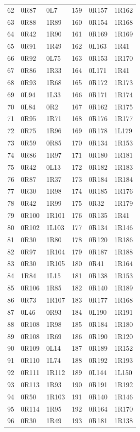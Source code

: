 \begin{longtable}{rll@{\qquad\qquad}rll}
62 & 0R87 & 0L7 & 159 & 0R157 & 1R162\\
63 & 0R88 & 1R89 & 160 & 0R154 & 1R168\\
64 & 0R42 & 1R90 & 161 & 0R169 & 1R169\\
65 & 0R91 & 1R49 & 162 & 0L163 & 1R41\\
66 & 0R92 & 0L75 & 163 & 0R153 & 1R170\\
67 & 0R86 & 1R33 & 164 & 0L171 & 1R41\\
68 & 0R93 & 1R68 & 165 & 0R172 & 1R173\\
69 & 0L94 & 1L33 & 166 & 0R171 & 1R174\\
70 & 0L84 & 0R2 & 167 & 0R162 & 1R175\\
71 & 0R95 & 1R71 & 168 & 0R176 & 1R177\\
72 & 0R75 & 1R96 & 169 & 0R178 & 1L179\\
73 & 0R59 & 0R85 & 170 & 0R134 & 1R153\\
74 & 0R86 & 1R97 & 171 & 0R180 & 1R181\\
75 & 0R42 & 0L13 & 172 & 0R182 & 1R183\\
76 & 0R87 & 1R37 & 173 & 0R184 & 1R184\\
77 & 0R30 & 1R98 & 174 & 0R185 & 1R176\\
78 & 0R42 & 1R99 & 175 & 0R32 & 1R179\\
79 & 0R100 & 1R101 & 176 & 0R135 & 1R41\\
80 & 0R102 & 1L103 & 177 & 0R134 & 1R146\\
81 & 0R30 & 1R80 & 178 & 0R120 & 1R186\\
82 & 0R97 & 1R104 & 179 & 0R187 & 1R188\\
83 & 0R30 & 1R105 & 180 & 0R41 & 1R164\\
84 & 1R84 & 1L15 & 181 & 0R138 & 1R153\\
85 & 0R106 & 1R85 & 182 & 0R140 & 1R189\\
86 & 0R73 & 1R107 & 183 & 0R177 & 1R168\\
87 & 0L46 & 0R93 & 184 & 0L190 & 1R191\\
88 & 0R108 & 1R98 & 185 & 0R184 & 1R180\\
89 & 0R108 & 1R69 & 186 & 0R190 & 1R120\\
90 & 0R109 & 0L14 & 187 & 0R189 & 1R152\\
91 & 0R110 & 1L74 & 188 & 0R192 & 1R193\\
92 & 0R111 & 1R112 & 189 & 0L144 & 1L150\\
93 & 0R113 & 1R93 & 190 & 0R191 & 1R192\\
94 & 0R50 & 1R103 & 191 & 0R140 & 1R146\\
95 & 0R114 & 1R95 & 192 & 0R164 & 1R170\\
96 & 0R30 & 1R49 & 193 & 0R181 & 1R138\\
\bottomrule\end{longtable}
\endgroup
